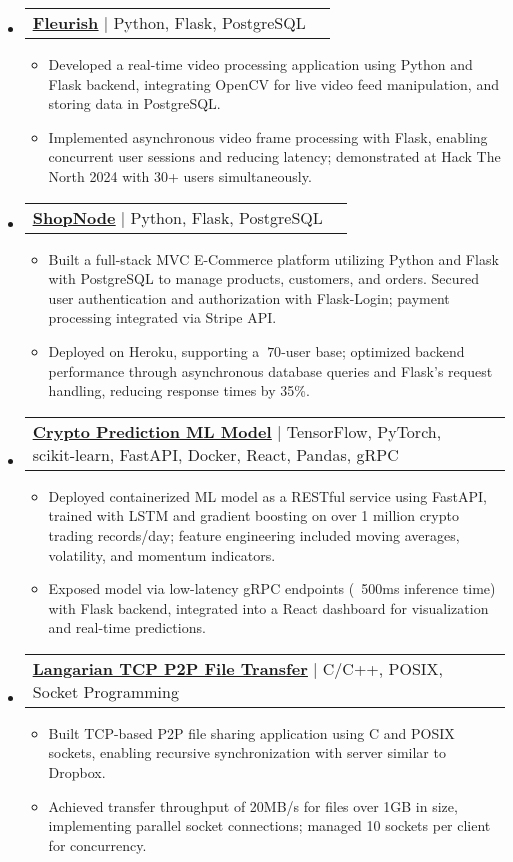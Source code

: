 \documentclass[letterpaper,11pt]{article}
\makeatletter
\newcommand{\resumeItem}[1]{\item\small{{#1 \vspace{-2pt}}}}
\newcommand{\resumeProjectHeading}[2]{\item
    \begin{tabular*}{0.97\textwidth}{l@{\extracolsep{\fill}}r}
      \small#1 & #2 \\
    \end{tabular*}\vspace{-4pt}}
\newcommand{\resumeSubHeadingListStart}{\begin{itemize}[leftmargin=0.15in, label={}]}
\newcommand{\resumeSubHeadingListEnd}{\end{itemize}}
\newcommand{\resumeItemListStart}{\begin{itemize}[label=\textbullet]}
\newcommand{\resumeItemListEnd}{\end{itemize}\vspace{-5pt}}
\makeatother
\begin{document}
\resumeSubHeadingListStart  %

\resumeProjectHeading
{\href{https://github.com/knightwayne/HackTheNorth-2024}{\underline{\textbf{Fleurish}}} | Python, Flask, PostgreSQL}{}
\resumeItemListStart
\resumeItem{Developed a real-time video processing application using Python and Flask backend, integrating OpenCV for live video feed manipulation, and storing data in PostgreSQL.}
\resumeItem{Implemented asynchronous video frame processing with Flask, enabling concurrent user sessions and reducing latency; demonstrated at Hack The North 2024 with 30+ users simultaneously.}
\resumeItemListEnd

\resumeProjectHeading
{\href{https://github.com/knightwayne/Ecommerce-Website}{\underline{\textbf{ShopNode}}} | Python, Flask, PostgreSQL}{}
\resumeItemListStart
\resumeItem{Built a full-stack MVC E-Commerce platform utilizing Python and Flask with PostgreSQL to manage products, customers, and orders. Secured user authentication and authorization with Flask-Login; payment processing integrated via Stripe API.}
\resumeItem{Deployed on Heroku, supporting a $~70$-user base; optimized backend performance through asynchronous database queries and Flask's request handling, reducing response times by 35\%.}
\resumeItemListEnd

\resumeProjectHeading
{\href{https://github.com/knightwayne/}{\underline{\textbf{Crypto Prediction ML Model}}} | TensorFlow, PyTorch, scikit-learn, FastAPI, Docker, React, Pandas, gRPC}{}
\resumeItemListStart
\resumeItem{Deployed containerized ML model as a RESTful service using FastAPI, trained with LSTM and gradient boosting on over 1 million crypto trading records/day; feature engineering included moving averages, volatility, and momentum indicators.}
\resumeItem{Exposed model via low-latency gRPC endpoints (~500ms inference time) with Flask backend, integrated into a React dashboard for visualization and real-time predictions.}
\resumeItemListEnd

\resumeProjectHeading
{\href{https://github.com/knightwayne/Mini-Dropbox-Simulator}{\underline{\textbf{Langarian TCP P2P File Transfer}}} | C/C++, POSIX, Socket Programming}{}
\resumeItemListStart
\resumeItem{Built TCP-based P2P file sharing application using C and POSIX sockets, enabling recursive synchronization with server similar to Dropbox.}
\resumeItem{Achieved transfer throughput of 20MB/s for files over 1GB in size, implementing parallel socket connections; managed 10 sockets per client for concurrency.}
\resumeItemListEnd

\resumeSubHeadingListEnd  %
\end{document}
